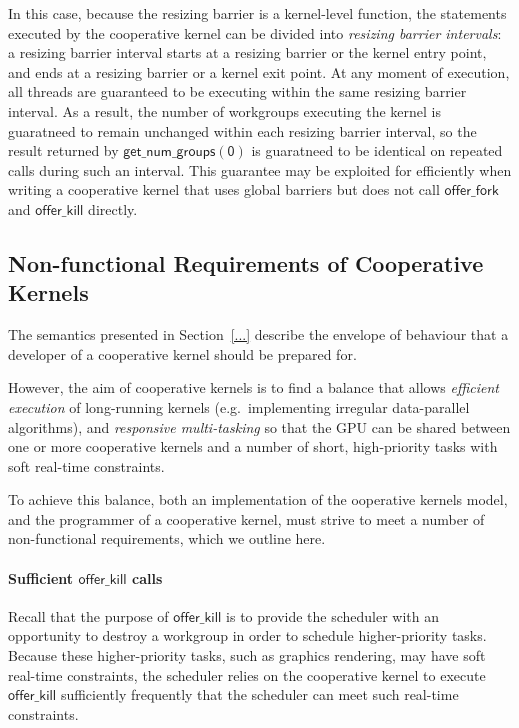 \documentclass[nocopyrightspace]{sigplanconf-pldi16}
\newcommand{\offerfork}{\mathsf{offer\_fork}}
\newcommand{\offerkill}{\mathsf{offer\_kill}}
\newcommand{\getnumgroups}[1]{\mathsf{get\_num\_groups(#1)}}
\begin{document}
In this case, because the resizing barrier is a kernel-level function,
the statements executed by the cooperative kernel can be divided into
\emph{resizing barrier intervals}: a resizing barrier interval starts
at a resizing barrier or the kernel entry point, and ends at a
resizing barrier or a kernel exit point.  At any moment of execution,
all threads are guaranteed to be executing within the same resizing
barrier interval.  As a result, the number of workgroups executing the
kernel is guaratneed to remain unchanged within each resizing barrier
interval, so the result returned by $\getnumgroups{0}$ is guaratneed
to be identical on repeated calls during such an interval.  This
guarantee may be exploited for efficiently when writing a cooperative
kernel that uses global barriers but does not call $\offerfork$ and
$\offerkill$ directly.

\subsection{Non-functional Requirements of Cooperative Kernels}

The semantics presented in Section~\ref{...} describe the envelope of
behaviour that a developer of a cooperative kernel should be prepared
for.

However, the aim of cooperative kernels is to find a balance that
allows \emph{efficient execution} of long-running kernels
(e.g.\ implementing irregular data-parallel algorithms), and
\emph{responsive multi-tasking} so that the GPU can be shared between
one or more cooperative kernels and a number of short, high-priority
tasks with soft real-time constraints.

To achieve this balance, both an implementation of the ooperative
kernels model, and the programmer of a cooperative kernel, must strive
to meet a number of non-functional requirements, which we outline
here.

\paragraph{Sufficient $\offerkill$ calls}

Recall that the purpose of $\offerkill$ is to provide the scheduler
with an opportunity to destroy a workgroup in order to schedule
higher-priority tasks.  Because these higher-priority tasks, such as
graphics rendering, may have soft real-time constraints, the scheduler
relies on the cooperative kernel to execute $\offerkill$ sufficiently
frequently that the scheduler can meet such real-time constraints.
\end{document}

